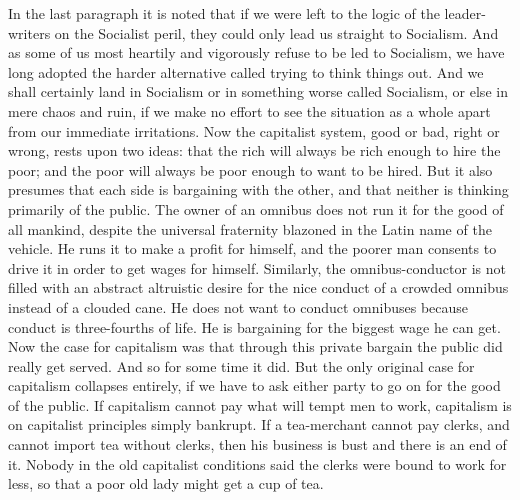 \documentclass{book}
\begin{document}
In the last paragraph it is noted that if we were left to the logic of the leader-writers on the Socialist peril, they could only lead us straight to Socialism. And as some of us most heartily and vigorously refuse to be led to Socialism, we have long adopted the harder alternative called trying to think things out. And we shall certainly land in Socialism or in something worse called Socialism, or else in mere chaos and ruin, if we make no effort to see the situation as a whole apart from our immediate irritations. Now the capitalist system, good or bad, right or wrong, rests upon two ideas: that the rich will always be rich enough to hire the poor; and the poor will always be poor enough to want to be hired. But it also presumes that each side is bargaining with the other, and that neither is thinking primarily of the public. The owner of an omnibus does not run it for the good of all mankind, despite the universal fraternity blazoned in the Latin name of the vehicle. He runs it to make a profit for himself, and the poorer man consents to drive it in order to get wages for himself. Similarly, the omnibus-conductor is not filled with an abstract altruistic desire for the nice conduct of a crowded omnibus instead of a clouded cane. He does not want to conduct omnibuses because conduct is three-fourths of life. He is bargaining for the biggest wage he can get. Now the case for capitalism was that through this private bargain the public did really get served. And so for some time it did. But the only original case for capitalism collapses entirely, if we have to ask either party to go on for the good of the public. If capitalism cannot pay what will tempt men to work, capitalism is on capitalist principles simply bankrupt. If a tea-merchant cannot pay clerks, and cannot import tea without clerks, then his business is bust and there is an end of it. Nobody in the old capitalist conditions said the clerks were bound to work for less, so that a poor old lady might get a cup of tea.
\end{document}
